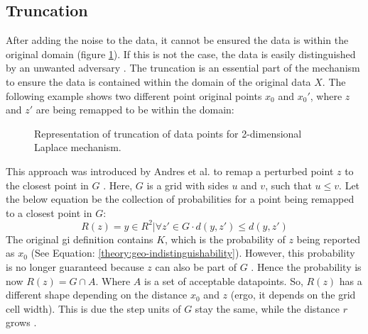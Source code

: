 \subsection{Truncation} \label{theory:truncation}
After adding the noise to the data, it cannot be ensured the data is within the original domain (figure \ref{figure:truncation-2d}).
If this is not the case, the data is easily distinguished by an unwanted adversary \citep{DBLP:journals/corr/abs-1212-1984,9646489}.
The truncation is an essential part of the mechanism to ensure the data is contained within the domain of the original data $X$. The following example shows two different point original points $x_0$ and $x_0'$, where $z$ and $z'$ are being remapped to be within the domain:
\begin{figure}[H]
\centering
  
  \caption{Representation of truncation of data points for 2-dimensional Laplace mechanism.}
  \label{figure:truncation-2d}
\end{figure}
This approach was introduced by Andres et al. to remap a perturbed point $z$ to the closest point in $G$ \citep{DBLP:journals/corr/abs-1212-1984}.
Here, $G$ is a grid with sides $u$ and $v$, such that $u \leq v$.
Let the below equation be the collection of probabilities for a point being remapped to a closest point in $G$:
\begin{equation}
  R(z) = { y \in R^2 | \forall z' \in G \cdot d(y, z') \leq d(y, z')}
  \label{eq:grid-probability}
\end{equation}
The original \gls{gi} definition contains $K$, which is the probability of $z$ being reported as $x_0$ (See Equation: \ref{theory:geo-indistinguishability}).
However, this probability is no longer guaranteed because $z$ can also be part of $G$ \citep{DBLP:journals/corr/abs-1212-1984}.
Hence the probability is now $R(z) = G \cap A$. Where $A$ is a set of acceptable datapoints.\newline
So, $R(z)$ has a different shape depending on the distance $x_0$ and $z$ (ergo, it depends on the grid cell width). This is due the step units of $G$ stay the same, while the distance $r$ grows \citep{DBLP:journals/corr/abs-1212-1984}.

